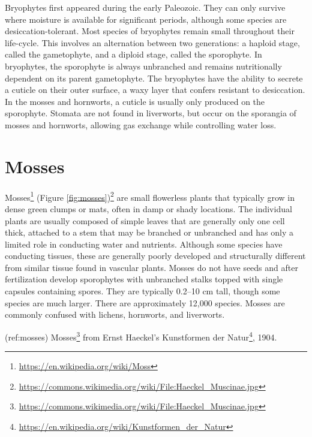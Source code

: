 \documentclass[]{book}
\let\rmarkdownfootnote\footnote%
\def\footnote{\protect\rmarkdownfootnote}
\renewcommand{\href}[2]{#2\footnote{\url{#1}}}
\theoremstyle{definition}
\theoremstyle{definition}
\theoremstyle{definition}
\theoremstyle{remark}
\begin{document}
Bryophytes first appeared during the early Paleozoic. They can only
survive where moisture is available for significant periods, although
some species are desiccation-tolerant. Most species of bryophytes remain
small throughout their life-cycle. This involves an alternation between
two generations: a haploid stage, called the gametophyte, and a diploid
stage, called the sporophyte. In bryophytes, the sporophyte is always
unbranched and remains nutritionally dependent on its parent
gametophyte. The bryophytes have the ability to secrete a cuticle on
their outer surface, a waxy layer that confers resistant to desiccation.
In the mosses and hornworts, a cuticle is usually only produced on the
sporophyte. Stomata are not found in liverworts, but occur on the
sporangia of mosses and hornworts, allowing gas exchange while
controlling water loss.

\section{Mosses}\label{mosses}

\href{https://en.wikipedia.org/wiki/Moss}{Mosses}
\href{https://commons.wikimedia.org/wiki/File:Haeckel_Muscinae.jpg}{(Figure
\ref{fig:mosses})} are small flowerless plants that typically grow in
dense green clumps or mats, often in damp or shady locations. The
individual plants are usually composed of simple leaves that are
generally only one cell thick, attached to a stem that may be branched
or unbranched and has only a limited role in conducting water and
nutrients. Although some species have conducting tissues, these are
generally poorly developed and structurally different from similar
tissue found in vascular plants. Mosses do not have seeds and after
fertilization develop sporophytes with unbranched stalks topped with
single capsules containing spores. They are typically 0.2--10 cm tall,
though some species are much larger. There are approximately 12,000
species. Mosses are commonly confused with lichens, hornworts, and
liverworts.

(ref:mosses)
\href{https://commons.wikimedia.org/wiki/File:Haeckel_Muscinae.jpg}{Mosses}
from Ernst Haeckel's
\href{https://en.wikipedia.org/wiki/Kunstformen_der_Natur}{Kunstformen
der Natur}, 1904.
\end{document}
